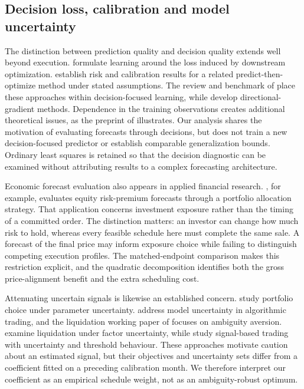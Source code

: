 \subsection{Decision loss, calibration and model uncertainty}
The distinction between prediction quality and decision quality extends well beyond execution. \citet{elmachtoub2022} formulate learning around the loss induced by downstream optimization. \citet{liu2021} establish risk and calibration results for a related predict-then-optimize method under stated assumptions. The review and benchmark of \citet{mandi2024} place these approaches within decision-focused learning, while \citet{gupta2024} develop directional-gradient methods. Dependence in the training observations creates additional theoretical issues, as the preprint of \citet{liudependent2024} illustrates. Our analysis shares the motivation of evaluating forecasts through decisions, but does not train a new decision-focused predictor or establish comparable generalization bounds. Ordinary least squares is retained so that the decision diagnostic can be examined without attributing results to a complex forecasting architecture.

Economic forecast evaluation also appears in applied financial research. \citet{maciel2025}, for example, evaluates equity risk-premium forecasts through a portfolio allocation strategy. That application concerns investment exposure rather than the timing of a committed order. The distinction matters: an investor can change how much risk to hold, whereas every feasible schedule here must complete the same sale. A forecast of the final price may inform exposure choice while failing to distinguish competing execution profiles. The matched-endpoint comparison makes this restriction explicit, and the quadratic decomposition identifies both the gross price-alignment benefit and the extra scheduling cost.

Attenuating uncertain signals is likewise an established concern. \citet{kan2007} study portfolio choice under parameter uncertainty. \citet{cartea2017} address model uncertainty in algorithmic trading, and the liquidation working paper of \citet{cartea_liquidation2017} focuses on ambiguity aversion. \citet{horst2022} examine liquidation under factor uncertainty, while \citet{demarch2018} study signal-based trading with uncertainty and threshold behaviour. These approaches motivate caution about an estimated signal, but their objectives and uncertainty sets differ from a coefficient fitted on a preceding calibration month. We therefore interpret our coefficient as an empirical schedule weight, not as an ambiguity-robust optimum.

